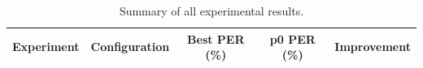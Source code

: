 \begin{table}[htbp]
\centering
\caption{Summary of all experimental results.}
\label{tab:all_results}
\begin{tabular}{llccc}
\toprule
\textbf{Experiment} & \textbf{Configuration} & \textbf{Best PER (\%)} & \textbf{p0 PER (\%)} & \textbf{Improvement} \\
\midrule
\bottomrule
\end{tabular}
\end{table}
